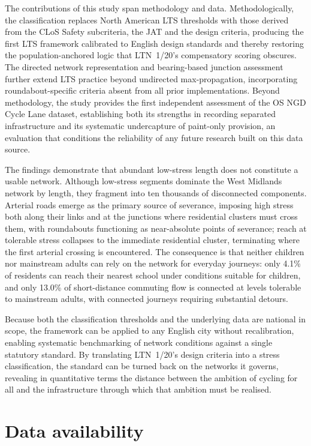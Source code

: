 \documentclass[final,5p,times,twocolumn,authoryear]{elsarticle}
\begin{document}
The contributions of this study span methodology and data. Methodologically,
the classification replaces North American LTS thresholds with those derived
from the CLoS Safety subcriteria, the JAT and the design criteria, producing the
first LTS framework calibrated to English design standards and thereby restoring
the population-anchored logic that LTN~1/20's compensatory scoring obscures. The
directed network representation and bearing-based junction assessment further
extend LTS practice beyond undirected max-propagation, incorporating
roundabout-specific criteria absent from all prior implementations. Beyond
methodology, the study provides the first independent assessment of the OS NGD
Cycle Lane dataset, establishing both its strengths in recording separated
infrastructure and its systematic undercapture of paint-only provision, an
evaluation that conditions the reliability of any future research built on this
data source.

The findings demonstrate that abundant low-stress length does not constitute a
usable network. Although low-stress segments dominate the West Midlands network
by length, they fragment into ten thousands of disconnected components.
Arterial roads emerge as the primary source of severance, imposing high stress
both along their links and at the junctions where residential clusters must
cross them, with roundabouts functioning as near-absolute points of severance;
reach at tolerable stress collapses to the immediate residential cluster,
terminating where the first arterial crossing is encountered. The consequence is
that neither children nor mainstream adults can rely on the network for everyday
journeys: only 4.1\% of residents can reach their nearest school under conditions
suitable for children, and only 13.0\% of short-distance commuting flow is
connected at levels tolerable to mainstream adults, with connected journeys
requiring substantial detours.

Because both the classification thresholds and the underlying data are national
in scope, the framework can be applied to any English city without
recalibration, enabling systematic benchmarking of network conditions against a
single statutory standard. By translating LTN~1/20's design criteria into a
stress classification, the standard can be turned back on the networks it
governs, revealing in quantitative terms the distance between the ambition of
cycling for all and the infrastructure through which that ambition must be
realised.

\section*{Data availability}
\end{document}
